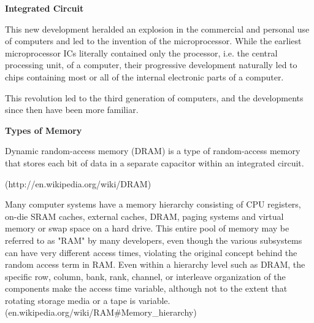 \documentclass[12pt, ]{article}
\begin{document}
\vspace*{2em}
\noindent \textbf{Integrated Circuit}

This new development heralded an explosion in the commercial and personal use of computers and led to the invention of the microprocessor. While the earliest microprocessor ICs literally contained only the processor, i.e. the central processing unit, of a computer, their progressive development naturally led to chips containing most or all of the internal electronic parts of a computer.

This revolution led to the third generation of computers, and the developments since then have been more familiar. 

\vspace*{2em}
\noindent \textbf{Types of Memory}

Dynamic random-access memory (DRAM) is a type of random-access memory that stores each bit of data in a separate capacitor within an integrated circuit.%


(http://en.wikipedia.org/wiki/DRAM)

Many computer systems have a memory hierarchy consisting of CPU registers, on-die SRAM caches, external caches, DRAM, paging systems and virtual memory or swap space on a hard drive. This entire pool of memory may be referred to as "RAM" by many developers, even though the various subsystems can have very different access times, violating the original concept behind the random access term in RAM. Even within a hierarchy level such as DRAM, the specific row, column, bank, rank, channel, or interleave organization of the components make the access time variable, although not to the extent that rotating storage media or a tape is variable. (en.wikipedia.org/wiki/RAM\#Memory\_hierarchy)
\end{document}
